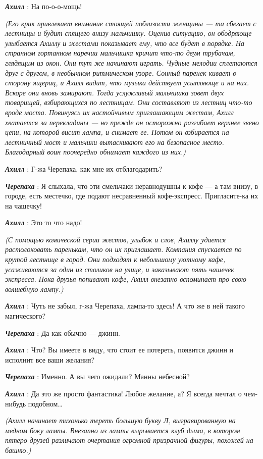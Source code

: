 \emph{\textbf{Ахилл}} : На по-о-о-мощь!

\emph{(Его крик привлекает внимание стоящей поблизости женщины --- та сбегает с лестницы и будит спящего внизу мальчишку. Оценив ситуацию, он ободряюще улыбается Ахиллу и жестами показывает ему, что все будет в порядке. На странном гортанном наречии мальчишка кричит что-то двум трубачам, глядящим из окон. Они тут же начинают играть. Чудные мелодии сплетаются друг с другом, в необычном ритмическом узоре. Сонный паренек кивает в сторону ящериц, и Ахилл видит, что музыка действует усыпляюще и на них. Вскоре они вновь замирают. Тогда услужливый мальчишка зовет двух товарищей, взбирающихся по лестницам. Они составляют из лестниц что-то вроде моста. Повинуясь их настойчивым приглашающим жестам, Ахилл хватается за перекладины --- но прежде он осторожно разгибает верхнее звено цепи, на которой висит лампа, и снимает ее. Потом он взбирается на лестничный мост и мальчики вытаскивают его на безопасное место. Благодарный воин поочередно обнимает каждого из них.)}

\emph{\textbf{Ахилл}} : Г-жа Черепаха, как мне их отблагодарить?

\emph{\textbf{Черепаха}} : Я слыхала, что эти смельчаки неравнодушны к кофе --- а там внизу, в городе, есть местечко, где подают несравненный кофе-экспресс. Пригласите-ка их на чашечку!

\emph{\textbf{Ахилл}} : Это то что надо!

\emph{(С помощью комической серии жестов, улыбок и слов, Ахиллу удается растолоковать паренькам, что он их приглашает. Компания спускается по крутой лестнице в город. Они подходят к небольшому уютному кафе, усаживаются за один из столиков на улице, и заказывают пять чашечек экспресса. Пока друзья попивают кофе, Ахилл внезапно вспоминает про свою волшебную лампу.)}

\emph{\textbf{Ахилл}} : Чуть не забыл, г-жа Черепаха, лампа-то здесь! А что же в ней такого магического?

\emph{\textbf{Черепаха}} : Да как обычно --- джинн.

\emph{\textbf{Ахилл}} : Что? Вы имеете в виду, что стоит ее потереть, появится джинн и исполнит все ваши желания?

\emph{\textbf{Черепаха}} : Именно. А вы чего ожидали? Манны небесной?

\emph{\textbf{Ахилл}} : Да это же просто фантастика! Любое желание, а? Я всегда мечтал о чем-нибудь подобном\ldots{}

\emph{(Ахилл начинает тихонько тереть большую букву Л, выгравированную на медном боку лампы. Внезапно из лампы вырывается клуб дыма, в котором пятеро друзей различают очертания огромной призрачной фигуры, похожей на башню.)}

